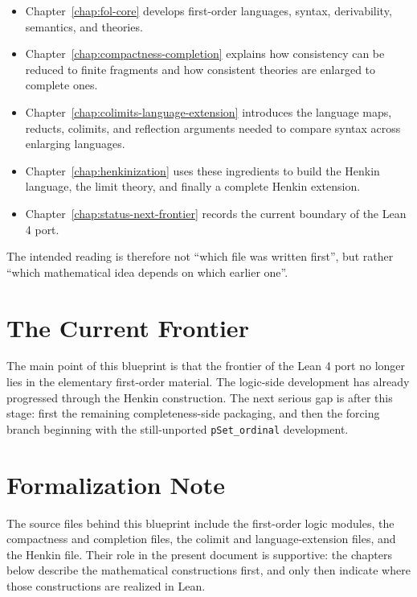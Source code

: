 \begin{itemize}
\item Chapter~\ref{chap:fol-core} develops first-order languages, syntax,
derivability, semantics, and theories.
\item Chapter~\ref{chap:compactness-completion} explains how consistency can be
reduced to finite fragments and how consistent theories are enlarged to
complete ones.
\item Chapter~\ref{chap:colimits-language-extension} introduces the language
maps, reducts, colimits, and reflection arguments needed to compare syntax
across enlarging languages.
\item Chapter~\ref{chap:henkinization} uses these ingredients to build the
Henkin language, the limit theory, and finally a complete Henkin extension.
\item Chapter~\ref{chap:status-next-frontier} records the current boundary of
the Lean 4 port.
\end{itemize}

The intended reading is therefore not ``which file was written first'', but
rather ``which mathematical idea depends on which earlier one''.

\section{The Current Frontier}

The main point of this blueprint is that the frontier of the Lean 4 port no
longer lies in the elementary first-order material. The logic-side development
has already progressed through the Henkin construction. The next serious gap is
after this stage: first the remaining completeness-side packaging, and then the
forcing branch beginning with the still-unported \texttt{pSet\_ordinal}
development.

\section{Formalization Note}

The source files behind this blueprint include the first-order logic modules,
the compactness and completion files, the colimit and language-extension files,
and the Henkin file. Their role in the present document is supportive: the
chapters below describe the mathematical constructions first, and only then
indicate where those constructions are realized in Lean.
